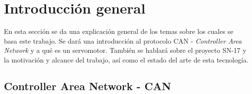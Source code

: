 
\chapter{Introducción general} %

\label{Chapter1} %
\label{IntroGeneral}


\newcommand{\keyword}[1]{\textbf{#1}}
\newcommand{\tabhead}[1]{\textbf{#1}}
\newcommand{\code}[1]{\texttt{#1}}
\newcommand{\file}[1]{\texttt{\bfseries#1}}
\newcommand{\option}[1]{\texttt{\itshape#1}}
\newcommand{\grados}{$^{\circ}$}



En esta sección se da una explicación general de los temas sobre los cuales se basa este trabajo. Se dará una introducción al protocolo CAN - \textit{Controller Area Network} y a qué es un servomotor. También se hablará sobre el proyecto SN-17 y la motivación y alcance del trabajo, así como el estado del arte de esta tecnología.

\section{Controller Area Network - CAN}

